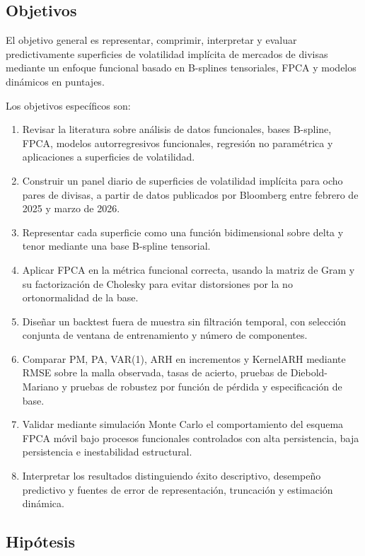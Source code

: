 \documentclass[a4paper,11pt]{article}
\newcommand{\SVIs}{superficies de volatilidad implícita}
\begin{document}
\subsection{Objetivos}

El objetivo general es representar, comprimir, interpretar y evaluar predictivamente \SVIs{} de mercados de divisas mediante un enfoque funcional basado en B-splines tensoriales, FPCA y modelos dinámicos en puntajes.

Los objetivos específicos son:

\begin{enumerate}
  \item Revisar la literatura sobre análisis de datos funcionales, bases B-spline, FPCA, modelos autorregresivos funcionales, regresión no paramétrica y aplicaciones a superficies de volatilidad.
  \item Construir un panel diario de \SVIs{} para ocho pares de divisas, a partir de datos publicados por Bloomberg entre febrero de 2025 y marzo de 2026.
  \item Representar cada superficie como una función bidimensional sobre delta y tenor mediante una base B-spline tensorial.
  \item Aplicar FPCA en la métrica funcional correcta, usando la matriz de Gram y su factorización de Cholesky para evitar distorsiones por la no ortonormalidad de la base.
  \item Diseñar un backtest fuera de muestra sin filtración temporal, con selección conjunta de ventana de entrenamiento y número de componentes.
  \item Comparar PM, PA, VAR(1), ARH en incrementos y KernelARH mediante RMSE sobre la malla observada, tasas de acierto, pruebas de Diebold-Mariano y pruebas de robustez por función de pérdida y especificación de base.
  \item Validar mediante simulación Monte Carlo el comportamiento del esquema FPCA móvil bajo procesos funcionales controlados con alta persistencia, baja persistencia e inestabilidad estructural.
  \item Interpretar los resultados distinguiendo éxito descriptivo, desempeño predictivo y fuentes de error de representación, truncación y estimación dinámica.
\end{enumerate}

\subsection{Hipótesis}
\end{document}
